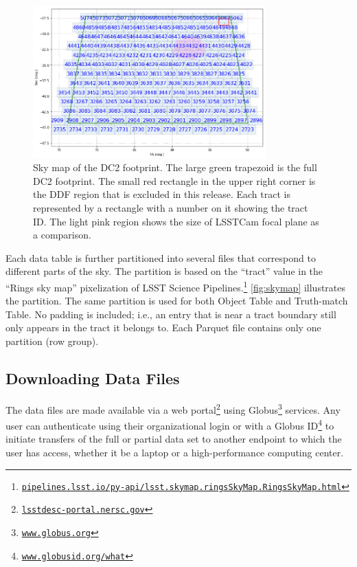 \documentclass[modern]{descnote}
\newcommand*{\https}[1]{\href{https://#1}{\nolinkurl{#1}}}
\begin{document}
\begin{figure}[tbh!]
    \centering
    \includegraphics[width=0.8\textwidth]{figs/skymap.png}
    \caption{Sky map of the DC2 footprint. The large green trapezoid is the full DC2 footprint. The small red rectangle in the upper right corner is the DDF region that is excluded in this release. Each tract is represented by a rectangle with a number on it showing the tract ID. The light pink region shows the size of LSSTCam focal plane as a comparison.}
    \label{fig:skymap}
\end{figure}

Each data table is further partitioned into several files that correspond to different parts of the sky. The partition is based on the ``tract'' value in the ``Rings sky map'' pixelization of LSST Science Pipelines.\footnote{\https{pipelines.lsst.io/py-api/lsst.skymap.ringsSkyMap.RingsSkyMap.html}} \autoref{fig:skymap} illustrates the partition. The same partition is used for both Object Table and Truth-match Table. No padding is included; i.e., an entry that is near a tract boundary still only appears in the tract it belongs to. Each Parquet file contains only one partition (row group). 




\subsection{Downloading Data Files}
\label{sec:download}

The data files are made available via a web portal\footnote{\https{lsstdesc-portal.nersc.gov}} using Globus\footnote{\https{www.globus.org}} services. Any user can authenticate using their organizational login or with a Globus ID\footnote{\https{www.globusid.org/what}} to initiate transfers of the full or partial data set to another endpoint to which the user has access, whether it be a laptop or a high-performance computing center. 
\end{document}
